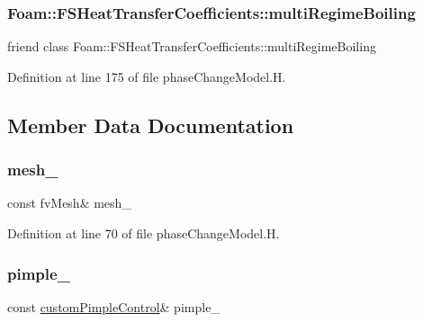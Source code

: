 \subsubsection{\texorpdfstring{Foam\+::\+F\+S\+Heat\+Transfer\+Coefficients\+::multi\+Regime\+Boiling}{Foam::FSHeatTransferCoefficients::multiRegimeBoiling}}
{\footnotesize\ttfamily friend class Foam\+::\+F\+S\+Heat\+Transfer\+Coefficients\+::multi\+Regime\+Boiling\hspace{0.3cm}{\ttfamily [friend]}}



Definition at line 175 of file phase\+Change\+Model.\+H.



\subsection{Member Data Documentation}
\mbox{\label{classFoam_1_1phaseChangeModel_a23edeeeecebcef11921a33dd5d990570}} 
\subsubsection{\texorpdfstring{mesh\+\_\+}{mesh\_}}
{\footnotesize\ttfamily const fv\+Mesh\& mesh\+\_\+\hspace{0.3cm}{\ttfamily [protected]}}



Definition at line 70 of file phase\+Change\+Model.\+H.

\mbox{\label{classFoam_1_1phaseChangeModel_a06f54c6f34cf95f4f0b3d573a196e0c5}} 
\subsubsection{\texorpdfstring{pimple\+\_\+}{pimple\_}}
{\footnotesize\ttfamily const \hyperlink{classFoam_1_1customPimpleControl}{custom\+Pimple\+Control}\& pimple\+\_\+\hspace{0.3cm}{\ttfamily [protected]}}



